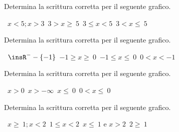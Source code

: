 \begin{esercizio}
 \label{ese:21.4}
 Determina la scrittura corretta per il seguente grafico.
  \begin{center}
  

  \boxA\quad~$x<5;x>3$\quad\boxB\quad~$3>x\ge~5$\quad\boxC\quad~$3\le x<5$\quad\boxD\quad~$3<x\le~5$
 \end{center}
  \end{esercizio}

\begin{esercizio}
 \label{ese:21.5}
Determina la scrittura corretta per il seguente grafico.
 \begin{center}
  

  \boxA\quad~$\insR^{-}-\{-1\}$\quad\boxB\quad~$-1\ge x\ge~0$\quad\boxC\quad~$-1\le x\le~0$\quad\boxD\quad~$0<x<-1$
 \end{center}
 \end{esercizio}

\begin{esercizio}
 \label{ese:21.6}
Determina la scrittura corretta per il seguente grafico.
 \begin{center}
  

  \boxA\quad~$x>0$\quad\boxB\quad~$x>-\infty $\quad\boxC\quad~$x\le~0$\quad\boxD\quad~$0<x\le~0$
 \end{center}
  \end{esercizio}

\begin{esercizio}
 \label{ese:21.7}
Determina la scrittura corretta per il seguente grafico.
 \begin{center}
  

  \boxA\quad~$x\ge~1;x<2$\quad\boxB\quad~$1\le x<2$\quad\boxC\quad~$x\le~1\text{ e }x>2$\quad\boxD\quad~$2\ge~1$
 \end{center}
  \end{esercizio}

\subsubsection*{}

